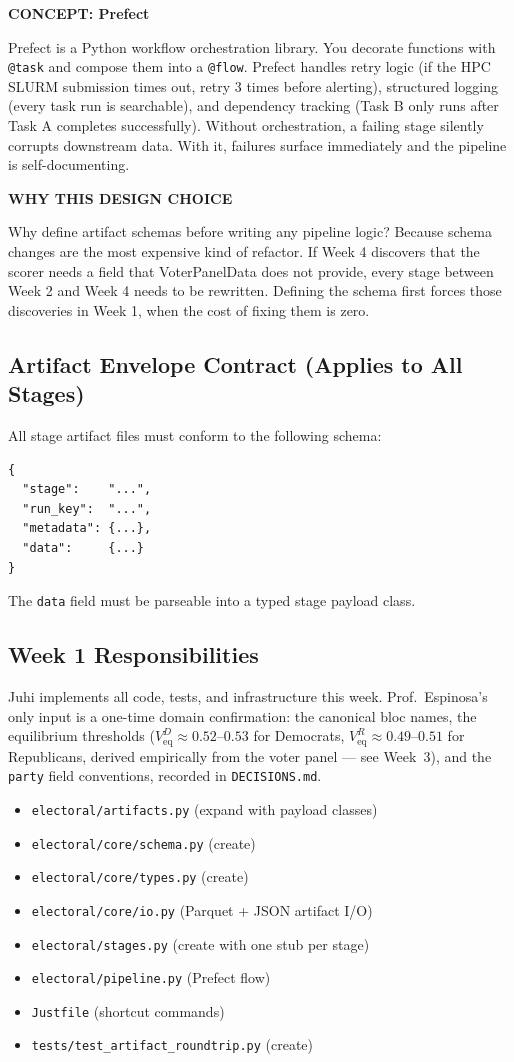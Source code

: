 \documentclass[11pt]{article}
\newcommand{\concept}[2]{%
  \begin{mdframed}[style=conceptbox]
  {\small\bfseries\color{bluefg}CONCEPT: #1}\par\smallskip #2
  \end{mdframed}}
\newcommand{\whybox}[1]{%
  \begin{mdframed}[style=whybox]
  {\small\bfseries\color{greenfg}WHY THIS DESIGN CHOICE}\par\smallskip #1
  \end{mdframed}}
\newcommand{\veq}{V_{\mathrm{eq}}}
\begin{document}
\concept{Prefect}{
Prefect is a Python workflow orchestration library. You decorate functions with
\texttt{@task} and compose them into a \texttt{@flow}. Prefect handles retry logic
(if the HPC SLURM submission times out, retry 3 times before alerting), structured
logging (every task run is searchable), and dependency tracking (Task B only runs
after Task A completes successfully). Without orchestration, a failing stage
silently corrupts downstream data. With it, failures surface immediately and the
pipeline is self-documenting.
}

\whybox{
Why define artifact schemas before writing any pipeline logic? Because schema changes
are the most expensive kind of refactor. If Week 4 discovers that the scorer needs a
field that VoterPanelData does not provide, every stage between Week 2 and Week 4
needs to be rewritten. Defining the schema first forces those discoveries in Week 1,
when the cost of fixing them is zero.
}

\subsection*{Artifact Envelope Contract (Applies to All Stages)}

All stage artifact files must conform to the following schema:
\begin{lstlisting}
{
  "stage":    "...",
  "run_key":  "...",
  "metadata": {...},
  "data":     {...}
}
\end{lstlisting}
The \texttt{data} field must be parseable into a typed stage payload class.

\subsection*{Week 1 Responsibilities}

Juhi implements all code, tests, and infrastructure this week. Prof.\ Espinosa's
only input is a one-time domain confirmation: the canonical bloc names, the
equilibrium thresholds ($\veq^{D} \approx 0.52\text{--}0.53$ for Democrats, $\veq^{R} \approx 0.49\text{--}0.51$ for Republicans, derived empirically from the voter panel --- see Week~3),
and the \texttt{party} field conventions, recorded in \texttt{DECISIONS.md}.
\begin{itemize}[leftmargin=1.6em, itemsep=2pt]
  \item \texttt{electoral/artifacts.py} (expand with payload classes)
  \item \texttt{electoral/core/schema.py} (create)
  \item \texttt{electoral/core/types.py} (create)
  \item \texttt{electoral/core/io.py} (Parquet + JSON artifact I/O)
  \item \texttt{electoral/stages.py} (create with one stub per stage)
  \item \texttt{electoral/pipeline.py} (Prefect flow)
  \item \texttt{Justfile} (shortcut commands)
  \item \texttt{tests/test\_artifact\_roundtrip.py} (create)
\end{itemize}
\end{document}
